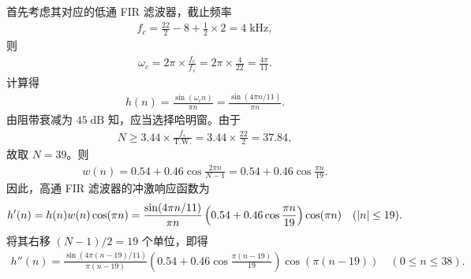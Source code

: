 \begin{solution}
    首先考虑其对应的低通 FIR 滤波器，截止频率
    \begin{align*}
        f_c = \frac{22}{2} - 8 + \frac{1}{2} \times 2 = 4\;\mathrm{kHz},
    \end{align*}
    则
    \begin{align*}
        \omega_c = 2\pi \times \frac{f_c}{f_s} = 2\pi \times \frac{4}{22} = \frac{4\pi}{11}.
    \end{align*}
    计算得
    \begin{align*}
        h(n) = \frac{\sin(\omega_c n)}{\pi n} = \frac{\sin(4\pi n / 11)}{\pi n}.
    \end{align*}
    由阻带衰减为 $45\;\mathrm{dB}$ 知，应当选择哈明窗。由于
    \begin{align*}
        N \ge 3.44 \times \frac{f_s}{\text{T.W.}} = 3.44 \times \frac{22}{2} = 37.84,
    \end{align*}
    故取 $N = 39$。则
    \begin{align*}
        w(n) = 0.54 + 0.46\cos\frac{2\pi n}{N - 1} = 0.54 + 0.46\cos\frac{\pi n}{19}.
    \end{align*}
    因此，高通 FIR 滤波器的冲激响应函数为
    \begin{align*}
        h'(n) = h(n) w(n) \cos(\pi n) = \frac{\sin(4\pi n / 11)}{\pi n} \left(0.54 + 0.46\cos\frac{\pi n}{19}\right) \cos(\pi n) \quad (\left|n\right| \le 19).
    \end{align*}
    将其右移 $(N - 1) / 2 = 19$ 个单位，即得
    \begin{align*}
        h''(n) = \frac{\sin(4\pi (n - 19) / 11)}{\pi (n - 19)} \left(0.54 + 0.46\cos\frac{\pi (n - 19)}{19}\right) \cos(\pi (n - 19)) \quad (0 \le n \le 38).
    \end{align*}
\end{solution}

